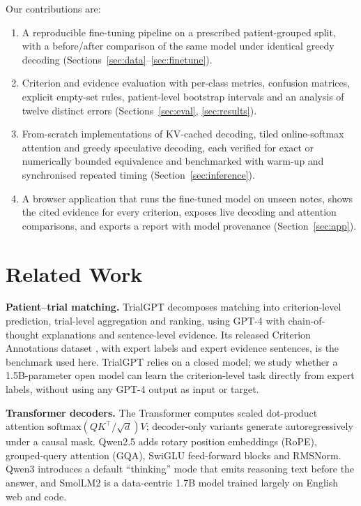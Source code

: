 \documentclass[conference]{IEEEtran}
\begin{document}
Our contributions are:
\begin{enumerate}
\item A reproducible fine-tuning pipeline on a prescribed patient-grouped split, with a before/after comparison of the same model under identical greedy decoding (Sections~\ref{sec:data}--\ref{sec:finetune}).
\item Criterion and evidence evaluation with per-class metrics, confusion matrices, explicit empty-set rules, patient-level bootstrap intervals and an analysis of twelve distinct errors (Sections~\ref{sec:eval}, \ref{sec:results}).
\item From-scratch implementations of KV-cached decoding, tiled online-softmax attention and greedy speculative decoding, each verified for exact or numerically bounded equivalence and benchmarked with warm-up and synchronised repeated timing (Section~\ref{sec:inference}).
\item A browser application that runs the fine-tuned model on unseen notes, shows the cited evidence for every criterion, exposes live decoding and attention comparisons, and exports a report with model provenance (Section~\ref{sec:app}).
\end{enumerate}

\section{Related Work}
\textbf{Patient--trial matching.} TrialGPT \cite{jin2024trialgpt} decomposes matching into criterion-level prediction, trial-level aggregation and ranking, using GPT-4 with chain-of-thought explanations and sentence-level evidence. Its released Criterion Annotations dataset \cite{trialgptdataset}, with expert labels and expert evidence sentences, is the benchmark used here. TrialGPT relies on a closed model; we study whether a 1.5B-parameter open model can learn the criterion-level task directly from expert labels, without using any GPT-4 output as input or target.

\textbf{Transformer decoders.} The Transformer \cite{vaswani2017attention} computes scaled dot-product attention $\mathrm{softmax}(QK^\top/\sqrt{d})V$; decoder-only variants generate autoregressively under a causal mask. Qwen2.5 \cite{qwen2025qwen25} adds rotary position embeddings (RoPE), grouped-query attention (GQA), SwiGLU feed-forward blocks and RMSNorm. Qwen3 \cite{qwen2025qwen3} introduces a default ``thinking'' mode that emits reasoning text before the answer, and SmolLM2 \cite{allal2025smollm2} is a data-centric 1.7B model trained largely on English web and code.
\end{document}
